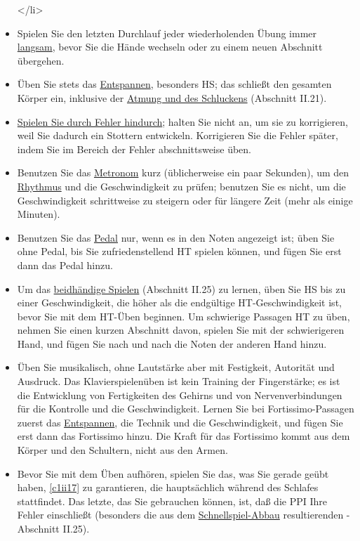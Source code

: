 \begin{itemize}
\begin{enumerate}[label={\alph*.}]
  \end{enumerate}
</li>
\item Spielen Sie den letzten Durchlauf jeder wiederholenden Übung immer \hyperref[c1ii17]{langsam}, bevor Sie die Hände wechseln oder zu einem neuen Abschnitt übergehen.

\item Üben Sie stets das \hyperref[c1ii14]{Entspannen}, besonders HS; das schließt den gesamten Körper ein, inklusive der \hyperref[c1ii21]{Atmung und des Schluckens} (Abschnitt II.21).

\item \hyperref[c1ii22]{Spielen Sie durch Fehler hindurch}; halten Sie nicht an, um sie zu korrigieren, weil Sie dadurch ein Stottern entwickeln.
Korrigieren Sie die Fehler später, indem Sie im Bereich der Fehler abschnittsweise üben.

\item Benutzen Sie das \hyperref[c1ii19]{Metronom} kurz (üblicherweise ein paar Sekunden), um den \hyperref[c1iii1b]{Rhythmus} und die Geschwindigkeit zu prüfen; benutzen Sie es nicht, um die Geschwindigkeit schrittweise zu steigern oder für längere Zeit (mehr als einige Minuten).
\item 
Benutzen Sie das \hyperref[c1ii23]{Pedal} nur, wenn es in den Noten angezeigt ist; üben Sie ohne Pedal, bis Sie zufriedenstellend HT spielen können, und fügen Sie erst dann das Pedal hinzu.

\item Um das \hyperref[c1ii25]{beidhändige Spielen} (Abschnitt II.25) zu lernen, üben Sie HS bis zu einer Geschwindigkeit, die höher als die endgültige HT-Geschwindigkeit ist, bevor Sie mit dem HT-Üben beginnen.
Um schwierige Passagen HT zu üben, nehmen Sie einen kurzen Abschnitt davon, spielen Sie mit der schwierigeren Hand, und fügen Sie nach und nach die Noten der anderen Hand hinzu.

\item Üben Sie musikalisch, ohne Lautstärke aber mit Festigkeit, Autorität und Ausdruck.
Das Klavierspielenüben ist kein Training der Fingerstärke; es ist die Entwicklung von Fertigkeiten des Gehirns und von Nervenverbindungen für die Kontrolle und die Geschwindigkeit.
Lernen Sie bei Fortissimo-Passagen zuerst das \hyperref[c1ii14]{Entspannen}, die Technik und die Geschwindigkeit, und fügen Sie erst dann das Fortissimo hinzu.
Die Kraft für das Fortissimo kommt aus dem Körper und den Schultern, nicht aus den Armen.

\item Bevor Sie mit dem Üben aufhören, spielen Sie das, was Sie gerade geübt haben, \hyperref[c1ii17]{\autoref{c1ii17}} zu garantieren, die hauptsächlich während des Schlafes stattfindet.
Das letzte, das Sie gebrauchen können, ist, daß die PPI Ihre Fehler einschließt (besonders die aus dem \hyperref[fpd]{Schnellspiel-Abbau} resultierenden - Abschnitt II.25).
 \end{itemize}




